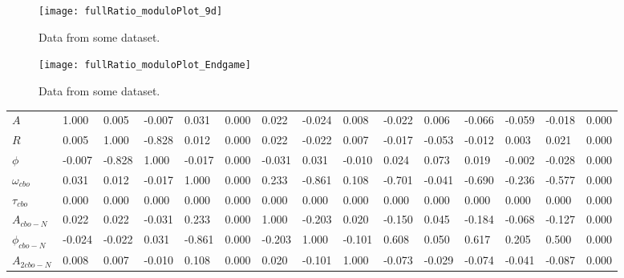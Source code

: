 \begin{figure}[]
    \centering
    \texttt{[image: fullRatio\_moduloPlot\_9d]}
    \caption[]{Data from some dataset.}
    \label{fig:}
\end{figure}

\begin{figure}[]
    \centering
    \texttt{[image: fullRatio\_moduloPlot\_Endgame]}
    \caption[]{Data from some dataset.}
    \label{fig:}
\end{figure}

\begin{landscape}
\begin{table}[]
\setlength\tabcolsep{5pt}
\footnotesize
\begin{tabular*}{\linewidth}{@{\extracolsep{\fill}}lLBLLLLLLLLLLLL}
  \toprule
            &  &  & \thead{$\phi$} &  &  &  &  &  &  &  &  &  &  &  \\
  \midrule
$A$                & 1.000 & 0.005 & -0.007 & 0.031 & 0.000 & 0.022 & -0.024 & 0.008 & -0.022 & 0.006 & -0.066 & -0.059 & -0.018 & 0.000  \\
$R$                & 0.005 & 1.000 & -0.828 & 0.012 & 0.000 & 0.022 & -0.022 & 0.007 & -0.017 & -0.053 & -0.012 & 0.003 & 0.021 & 0.000  \\
$\phi$             & -0.007 & -0.828 & 1.000 & -0.017 & 0.000 & -0.031 & 0.031 & -0.010 & 0.024 & 0.073 & 0.019 & -0.002 & -0.028 & 0.000  \\
$\omega_{cbo}$     & 0.031 & 0.012 & -0.017 & 1.000 & 0.000 & 0.233 & -0.861 & 0.108 & -0.701 & -0.041 & -0.690 & -0.236 & -0.577 & 0.000  \\
$\tau_{cbo}$       & 0.000 & 0.000 & 0.000 & 0.000 & 0.000 & 0.000 & 0.000 & 0.000 & 0.000 & 0.000 & 0.000 & 0.000 & 0.000 & 0.000  \\
$A_{cbo-N}$        & 0.022 & 0.022 & -0.031 & 0.233 & 0.000 & 1.000 & -0.203 & 0.020 & -0.150 & 0.045 & -0.184 & -0.068 & -0.127 & 0.000  \\
$\phi_{cbo-N}$     & -0.024 & -0.022 & 0.031 & -0.861 & 0.000 & -0.203 & 1.000 & -0.101 & 0.608 & 0.050 & 0.617 & 0.205 & 0.500 & 0.000  \\
$A_{2cbo-N}$       & 0.008 & 0.007 & -0.010 & 0.108 & 0.000 & 0.020 & -0.101 & 1.000 & -0.073 & -0.029 & -0.074 & -0.041 & -0.087 & 0.000  \\

\end{tabular*}
\end{table}
\end{landscape}

